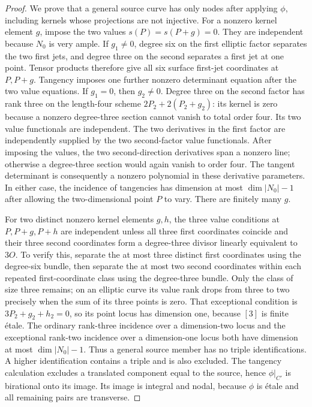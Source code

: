\begin{proof}
We prove that a general source curve has only nodes after applying
$\phi$, including kernels whose projections are not injective.
For a nonzero kernel element $g$, impose the two values
$s(P)=s(P+g)=0$.  They are independent because $N_0$ is very ample.
If $g_1\ne0$, degree six on the first elliptic factor separates the
two first jets, and degree three on the second separates a first
jet at one point.  Tensor products therefore give all six surface
first-jet coordinates at $P,P+g$.  Tangency imposes one further
nonzero determinant equation after the two value equations.
If $g_1=0$, then $g_2\ne0$.  Degree three on the second factor has
rank three on the length-four scheme $2P_2+2(P_2+g_2)$: its kernel
is zero because a nonzero degree-three section cannot vanish to
total order four.  Its two value functionals are independent.
The two derivatives in the first factor are independently supplied
by the two second-factor value functionals.  After imposing the
values, the two second-direction derivatives span a nonzero line;
otherwise a degree-three section would again vanish to order four.
The tangent determinant is consequently a nonzero polynomial in
these derivative parameters.  In either case, the incidence of
tangencies has dimension at most $\dim|N_0|-1$ after allowing the
two-dimensional point $P$ to vary.  There are finitely many $g$.

For two distinct nonzero kernel elements $g,h$, the three value
conditions at $P,P+g,P+h$ are independent unless all three first
coordinates coincide and their three second coordinates form a
degree-three divisor linearly equivalent to $3O$.
To verify this, separate the at most three distinct first coordinates
using the degree-six bundle, then separate the at most two second
coordinates within each repeated first-coordinate class using the
degree-three bundle.  Only the class of size three remains; on an
elliptic curve its value rank drops from three to two precisely when
the sum of its three points is zero.
That exceptional condition is $3P_2+g_2+h_2=0$, so its point locus
has dimension one, because $[3]$ is finite \'etale.  The ordinary
rank-three incidence over a dimension-two locus and the exceptional
rank-two incidence over a dimension-one locus both have dimension
at most $\dim|N_0|-1$.  Thus a general source member has no triple
identifications.  A higher identification contains a triple and is
also excluded.  The tangency calculation excludes a translated
component equal to the source, hence $\phi|_{C'}$ is birational onto
its image.  Its image is integral and nodal, because $\phi$ is \'etale
and all remaining pairs are transverse.


\end{proof}
